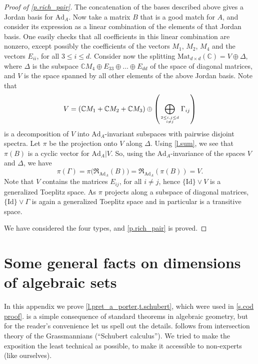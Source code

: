 \documentclass[10pt, a4paper]{amsart}
\theoremstyle{plain}
\theoremstyle{definition}
\theoremstyle{remark}
\theoremstyle{note}
\numberwithin{equation}{section}
\begin{document}
\begin{proof}[Proof of \cref{p.rich_pair}]
The concatenation of the bases described above gives a Jordan basis for ${{\mathrm{Ad}}_{A}}$. 
Now take a matrix $B$ that is a good match for $A$,
and consider its expression as a linear combination of the elements of that Jordan basis.
One easily checks that all coefficients in this linear combination are nonzero, except possibly
the coefficients of the vectors $M_1$, $M_2$, $M_4$ and the vectors $E_{ii}$, for all $3\leq i\leq d$.
Consider now the splitting ${\mathrm{Mat}}_{d \times d}({\mathbb{C}}) =  V \oplus \Delta$, where $\Delta$ is the subspace ${\mathbb{C}} M_4 \oplus E_{33} \oplus \ldots \oplus E_{dd}$ of the space of diagonal matrices, and 
$V$ is the space spanned by all other elements of the above Jordan basis. Note that
\begin{align*}
V=({\mathbb{C}} M_1+{\mathbb{C}} M_2+{\mathbb{C}} M_3)\oplus \left(\bigoplus_{2\leq i,j\leq d\atop i\neq j}\Gamma_{ij}\right)
\end{align*}
is a decomposition of $V$ into ${\mathrm{Ad}}_A$-invariant subspaces with pairwise disjoint spectra. 
Let $\pi$ be the projection onto $V$ along $\Delta$.
Using \cref{l.sum}, we see that $\pi(B)$ is a cyclic vector for ${\mathrm{Ad}}_A | V$.
So, using the ${\mathrm{Ad}}_A$-invariance of the spaces $V$ and $\Delta$, we have
$$
\pi (\Gamma) = 
\pi \big( {\mathfrak{R}}_{{\mathrm{Ad}}_A} (B) \big) = 
{\mathfrak{R}}_{{\mathrm{Ad}}_A} (\pi(B)) = V. 
$$
Note that $V$ contains the matrices $E_{ij}$, for all $i\neq j$, hence $\{{\mathrm{Id}}\} \vee V$ is a generalized Toeplitz space. As $\pi$ projects along a subspace of diagonal matrices,  $\{{\mathrm{Id}}\} \vee \Gamma$ is again a generalized Toeplitz space and in particular is a transitive space.

\medskip

We have considered the four types, and \cref{p.rich_pair} is proved.
\end{proof}

\section{Some general facts on dimensions of algebraic sets}\label{a.algebraic}

In this appendix we prove \cref{l.pret_a_porter,t.schubert},
which were used in \cref{s.cod proof}.
 is a simple consequence of standard theorems in algebraic geometry, 
but for the reader's convenience let us spell out the details. 
 follows from intersection theory of the Grassmannians (``Schubert calculus'').
We tried to make the exposition the least technical as possible, to make it accessible to non-experts (like ourselves).
\end{document}
